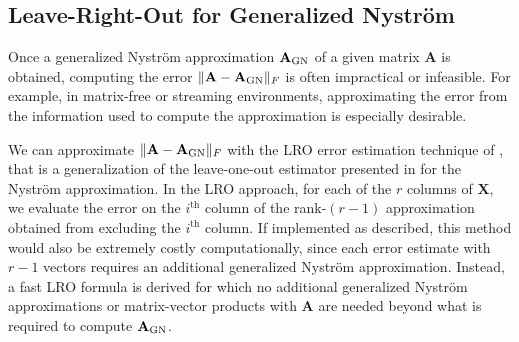 \documentclass[11pt]{article}
\newcommand{\GN}{generalized Nyström}
\newcommand{\Ny}{Nyström}
\newcommand{\GNa}{generalized Nyström approximation}
\newcommand{\gnX}{\mathbf{A}_{\textup{GN}}}
\newcommand{\F}{\mathbb{F}}
\newcommand{\njk}[3]{#1_{-#2, -#3}} %
\begin{document}
\subsection{Leave-Right-Out for Generalized Nystr\"om}\label{subsec:LRO_GN}

Once a generalized \Ny{} approximation $\gnX$ of a given matrix $\mathbf{A}$ is obtained, computing the error $\|\mathbf{A} - \gnX \|_F$ is often impractical or infeasible.
For example, in matrix-free or streaming environments, approximating the error from the information used to compute the approximation is especially desirable.


We can approximate $\| \mathbf{A} - \gnX \|_F$ with the LRO error estimation technique of \cite{LazPearPrit26}, that is a generalization of the leave-one-out estimator presented in \cite{EpperlyTropp_VarianceEst2024} for the \Ny{} approximation.
In the LRO approach, for each of the $r$ columns of $\mathbf{X}$, we evaluate the error on the $i^\text{th}$ column of the rank-$(r-1)$ approximation obtained from excluding the $i^\text{th}$ column.
If implemented as described, this method would also be extremely costly computationally, since each error estimate with $r-1$ vectors requires an additional \GN{} approximation.
Instead, a fast LRO formula is derived for which no additional \GN{} approximations or matrix-vector products with $\mathbf{A}$ are needed beyond what is required to compute $\gnX$.
\end{document}
